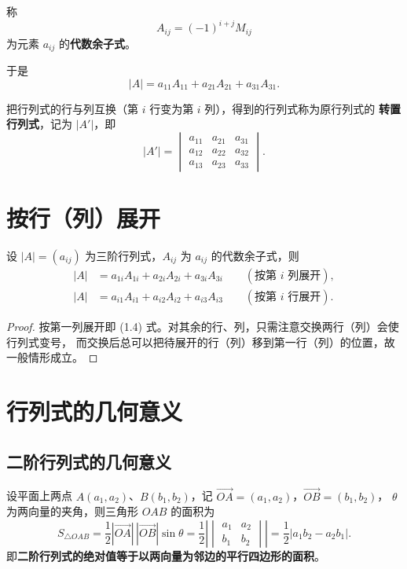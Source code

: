 \begin{definition}[代数余子式]
称
\[
A_{ij}=(-1)^{i+j}M_{ij}
\]
为元素 $a_{ij}$ 的\textbf{代数余子式}。
\end{definition}

于是
\[
|A| = a_{11}A_{11}+a_{21}A_{21}+a_{31}A_{31}.
\]

\begin{definition}[转置行列式]
把行列式的行与列互换（第 $i$ 行变为第 $i$ 列），得到的行列式称为原行列式的
\textbf{转置行列式}，记为 $|A'|$，即
\[
|A'|=\begin{vmatrix}
a_{11} & a_{21} & a_{31}\\
a_{12} & a_{22} & a_{32}\\
a_{13} & a_{23} & a_{33}
\end{vmatrix}.
\]
\end{definition}

\section{按行（列）展开}

\begin{proposition}[展开定理]
设 $|A|=(a_{ij})$ 为三阶行列式，$A_{ij}$ 为 $a_{ij}$ 的代数余子式，则
\begin{align}
|A| &= a_{1i}A_{1i}+a_{2i}A_{2i}+a_{3i}A_{3i} \qquad (\text{按第 } i \text{ 列展开}),\\
|A| &= a_{i1}A_{i1}+a_{i2}A_{i2}+a_{i3}A_{i3} \qquad (\text{按第 } i \text{ 行展开}).
\end{align}
\end{proposition}

\begin{proof}
按第一列展开即 (1.4) 式。对其余的行、列，只需注意交换两行（列）会使行列式变号，
而交换后总可以把待展开的行（列）移到第一行（列）的位置，故一般情形成立。
\end{proof}

\section{行列式的几何意义}

\subsection{二阶行列式的几何意义}

设平面上两点 $A(a_1,a_2)$、$B(b_1,b_2)$，记 $\vec{OA}=(a_1,a_2)$，$\vec{OB}=(b_1,b_2)$，
$\theta$ 为两向量的夹角，则三角形 $OAB$ 的面积为
\[
S_{\triangle OAB}=\frac12|\vec{OA}|\,|\vec{OB}|\sin\theta
=\frac12\left|\begin{vmatrix} a_1 & a_2\\ b_1 & b_2\end{vmatrix}\right|
=\frac12|a_1b_2-a_2b_1|.
\]
即\textbf{二阶行列式的绝对值等于以两向量为邻边的平行四边形的面积}。

